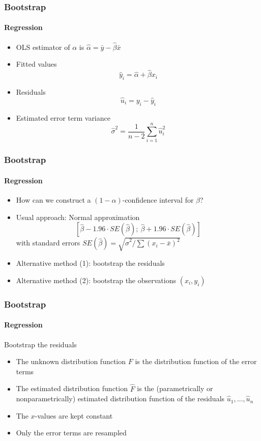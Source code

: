 \documentclass[smaller,compress]{beamer}
\begin{document}
\begin{frame}\frametitle{Bootstrap}\framesubtitle{Regression}
\begin{itemize}
    \item OLS estimator of $\alpha $ is $\hat{\alpha}=\bar{y}-\hat{\beta}\bar{x}$
    \item Fitted values
    \begin{equation*}
    \hat{y}_{i}=\hat{\alpha}+\hat{\beta}x_{i}
    \end{equation*}
    \item Residuals
    \begin{equation*}
    \hat{u}_{i}=y_{i}-\hat{y}_{i}
    \end{equation*}
    \item Estimated error term variance
    \begin{equation*}
    \hat{\sigma}^{2}=\frac{1}{n-2}\sum_{i=1}^{n}\hat{u}_{i}^{2}
    \end{equation*}
\end{itemize}
\end{frame}


\begin{frame}\frametitle{Bootstrap}\framesubtitle{Regression}
\begin{itemize}
    \item How can we construct a $(1-\alpha )$-confidence interval for $\beta $?
    \item Usual approach: Normal approximation
    \begin{equation*}
    \left[ \hat{\beta}-1.96\cdot SE(\hat{\beta});\ \hat{\beta}+1.96\cdot SE(\hat{\beta})\right]
    \end{equation*}
    with standard errors $SE(\hat{\beta})=\sqrt{\hat{\sigma}^{2}/\sum \left(x_{i}-\bar{x}\right) ^{2}}$
    \item Alternative method (1): bootstrap the residuals
    \item Alternative method (2): bootstrap the observations $(x_{i},y_{i})$
\end{itemize}
\end{frame}


\begin{frame}\frametitle{Bootstrap}\framesubtitle{Regression}
Bootstrap the residuals
\begin{itemize}
    \item The unknown distribution function $F$ is the distribution function of the error terms
    \item The estimated distribution function $\hat{F}$ is the (parametrically or nonparametrically) estimated distribution function of the residuals $\hat{u}_{1},\ldots ,\hat{u}_{n}$
    \item The $x$-values are kept constant
    \item Only the error terms are resampled
\end{itemize}
\end{frame}
\end{document}
